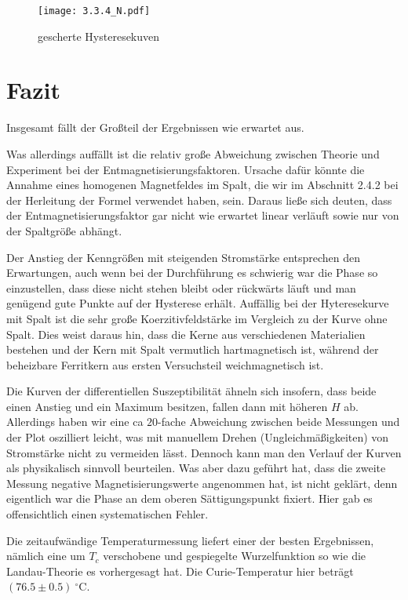 \documentclass[12pt,a4paper]{scrartcl}
\numberwithin{equation}{section} %
\renewcommand{\[}{} %
\renewcommand{\]}{\noindent} %
\begin{document}
\begin{figure}
\centering
\texttt{[image: 3.3.4\_N.pdf]}
\caption{gescherte Hysteresekuven}
\end{figure}

\hypertarget{fazit}{%
\section{Fazit}\label{fazit}}

Insgesamt fällt der Großteil der Ergebnissen wie erwartet aus.

Was allerdings auffällt ist die relativ große Abweichung zwischen
Theorie und Experiment bei der Entmagnetisierungsfaktoren. Ursache dafür
könnte die Annahme eines homogenen Magnetfeldes im Spalt, die wir im
Abschnitt 2.4.2 bei der Herleitung der Formel verwendet haben, sein.
Daraus ließe sich deuten, dass der Entmagnetisierungsfaktor gar nicht
wie erwartet linear verläuft sowie nur von der Spaltgröße abhängt.

Der Anstieg der Kenngrößen mit steigenden Stromstärke entsprechen den
Erwartungen, auch wenn bei der Durchführung es schwierig war die Phase
so einzustellen, dass diese nicht stehen bleibt oder rückwärts läuft und
man genügend gute Punkte auf der Hysterese erhält. Auffällig bei der
Hyteresekurve mit Spalt ist die sehr große Koerzitivfeldstärke im
Vergleich zu der Kurve ohne Spalt. Dies weist daraus hin, dass die Kerne
aus verschiedenen Materialien bestehen und der Kern mit Spalt vermutlich
hartmagnetisch ist, während der beheizbare Ferritkern aus ersten
Versuchsteil weichmagnetisch ist.

Die Kurven der differentiellen Suszeptibilität ähneln sich insofern,
dass beide einen Anstieg und ein Maximum besitzen, fallen dann mit
höheren \(H\) ab. Allerdings haben wir eine ca \(20\)-fache Abweichung
zwischen beide Messungen und der Plot oszilliert leicht, was mit
manuellem Drehen (Ungleichmäßigkeiten) von Stromstärke nicht zu
vermeiden lässt. Dennoch kann man den Verlauf der Kurven als
physikalisch sinnvoll beurteilen. Was aber dazu geführt hat, dass die
zweite Messung negative Magnetisierungswerte angenommen hat, ist nicht
geklärt, denn eigentlich war die Phase an dem oberen Sättigungspunkt
fixiert. Hier gab es offensichtlich einen systematischen Fehler.

Die zeitaufwändige Temperaturmessung liefert einer der besten
Ergebnissen, nämlich eine um \(T_{c}\) verschobene und gespiegelte
Wurzelfunktion so wie die Landau-Theorie es vorhergesagt hat. Die
Curie-Temperatur hier beträgt \((76.5 \pm 0.5) \ ^\circ\mathrm C\).
\end{document}
